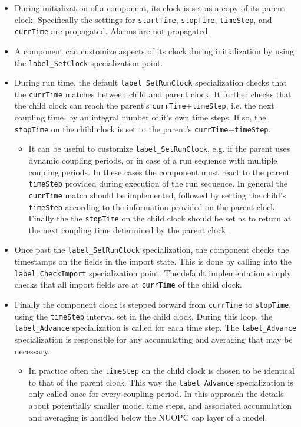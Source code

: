 \begin{itemize}
\item During initialization of a component, its clock is set as a copy of its parent clock. Specifically the settings for {\tt startTime}, {\tt stopTime}, {\tt timeStep}, and {\tt currTime} are propagated. Alarms are not propagated.
\item A component can customize aspects of its clock during initialization by using the {\tt label\_SetClock} specialization point.
\item During run time, the default {\tt label\_SetRunClock} specialization checks that the {\tt currTime} matches between child and parent clock. It further checks that the child clock can reach the parent's {\tt currTime}+{\tt timeStep}, i.e. the next coupling time, by an integral number of it's own time steps. If so, the {\tt stopTime} on the child clock is set to the parent's {\tt currTime}+{\tt timeStep}.
\begin{itemize}
\item It can be useful to customize {\tt label\_SetRunClock}, e.g. if the parent uses dynamic coupling periods, or in case of a run sequence with multiple coupling periods. In these cases the component must react to the parent {\tt timeStep} provided during execution of the run sequence. In general the {\tt currTime} match should be implemented, followed by setting the child's {\tt timeStep} according to the information provided on the parent clock. Finally the the {\tt stopTime} on the child clock should be set as to return at the next coupling time determined by the parent clock.
\end{itemize}
\item Once past the {\tt label\_SetRunClock} specialization, the component checks the timestamps on the fields in the import state. This is done by calling into the {\tt label\_CheckImport} specialization point. The default implementation simply checks that all import fields are at {\tt currTime} of the child clock. 
\item Finally the component clock is stepped forward from {\tt currTime} to {\tt stopTime}, using the {\tt timeStep} interval set in the child clock. During this loop, the {\tt label\_Advance} specialization is called for each time step. The {\tt label\_Advance} specialization is responsible for any accumulating and averaging that may be necessary.
\begin{itemize}
\item In practice often the {\tt timeStep} on the child clock is chosen to be identical to that of the parent clock. This way the {\tt label\_Advance} specialization is only called once for every coupling period. In this approach the details about potentially smaller model time steps, and associated accumulation and averaging is handled below the NUOPC cap layer of a model.

\end{itemize}
\end{itemize}
